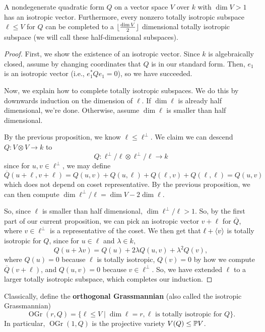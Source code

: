 \documentclass[12pt]{article}
\DeclareMathOperator{\OGr}{OGr}
\begin{document}
\begin{prop}
    A nondegenerate quadratic form $Q$ on a vector space $V$ over $k$ with $\dim V> 1$ has an isotropic vector. Furthermore, every nonzero totally isotropic subspace $\ell \leq V$ for $Q$ can be completed to a $\floor{\frac{\dim V}{2}}$ dimensional totally isotropic subspace (we will call these half-dimensional subspaces).
\end{prop}

\begin{proof}
    First, we show the existence of an isotropic vector. Since $k$ is algebraically closed, assume by changing coordinates that $Q$ is in our standard form. Then, $e_1$ is an isotropic vector (i.e., $e_1^* Q e_1 = 0$), so we have succeeded.

    Now, we explain how to complete totally isotropic subspaces. We do this by downwards induction on the dimension of $\ell$. If $\dim \ell$ is already half dimensional, we're done. Otherwise, assume $\dim \ell$ is smaller than half dimensional.
    
    By the previous proposition, we know $\ell\leq \ell^\perp$. We claim we can descend $Q: V\otimes V \to k$ to
    \[Q: \ell^\perp/\ell \otimes \ell^\perp/\ell \to k\]
    since for $u,v\in \ell^\perp$, we may define
    \[\overline{Q}(u+\ell,v+\ell) = Q(u,v) + Q(u,\ell) + Q(\ell,v)+Q(\ell,\ell) = Q(u,v)\]
    which does not depend on coset representative. By the previous proposition, we can then compute $\dim \ell^\perp/\ell = \dim V - 2\dim \ell$.
    
    So, since $\ell$ is smaller than half dimensional, $\dim \ell^\perp/\ell > 1$. So, by the first part of our current proposition, we can pick an isotropic vector $v+\ell$ for $\overline{Q}$, where $v\in \ell^\perp$ is a representative of the coset. We then get that $\ell+\<v\>$ is totally isotropic for $Q$, since for $u\in \ell$ and $\lambda\in k$,
    \[Q(u+\lambda v)=Q(u) + 2 \lambda Q(u,v) + \lambda^2 Q(v),\]
    where $Q(u)=0$ because $\ell$ is totally isotropic, $Q(v)=0$ by how we compute $\overline{Q}(v+\ell)$, and $Q(u,v) = 0$ because $v \in \ell^\perp$. So, we have extended $\ell$ to a larger totally isotropic subspace, which completes our induction.
\end{proof}

\begin{defn}
    Classically, define the \textbf{orthogonal Grassmannian} (also called the isotropic Grassmannian)
    \[\OGr(r,Q) = \{\ell \leq V \mid \dim \ell = r, \ell \text{ is totally isotropic for $Q$}\}.\]
    In particular, $\OGr(1,Q)$ is the projective variety $V(Q) \leq \P V$.
\end{defn}
\end{document}
